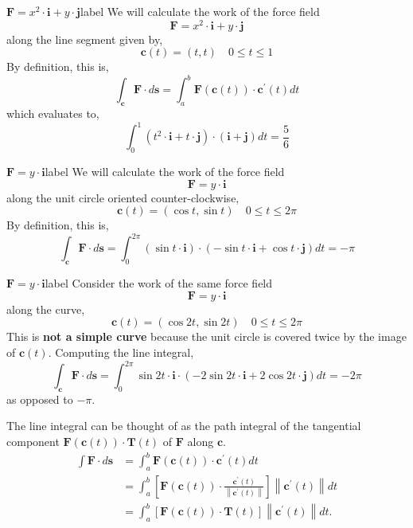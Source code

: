 \begin{ex}{$\mathbf{F} = x^2 \cdot \mathbf{i} + y \cdot \mathbf{j}$}{label}
	We will calculate the work of the force field
	\[\mathbf{F} = x^2 \cdot \mathbf{i} + y \cdot \mathbf{j}\]
	along the line segment given by,
	\[\mathbf{c}(t) = (t, t) \quad 0 \leq t \leq 1\]
	By definition, this is, 
	\[\int_{\mathbf{c}} \mathbf{F} \cdot d \mathbf{s}=\int_a^b \mathbf{F}(\mathbf{c}(t)) \cdot \mathbf{c}^{\prime}(t) d t\]
	which evaluates to,
	\[\int_0^1\left(t^2 \cdot \mathbf{i}+t \cdot \mathbf{j}\right) \cdot(\mathbf{i}+\mathbf{j}) d t = \frac{5}{6}\]
\end{ex}

\begin{ex}{$\mathbf{F} = y \cdot \mathbf{i}$}{label}
	We will calculate the work of the force field
	\[\mathbf{F} = y \cdot \mathbf{i}\]
	along the unit circle oriented counter-clockwise,
	\[\mathbf{c}(t) = (\cos t, \sin t) \quad 0 \leq t \leq 2 \pi\]
	By definition, this is, 
	\[\int_{\mathbf{c}} \mathbf{F} \cdot d \mathbf{s} = \int_{0}^{2\pi} (\sin t \cdot \mathbf{i}) \cdot (-\sin t \cdot \mathbf{i} + \cos t \cdot \mathbf{j}) dt = -\pi\]
\end{ex}

\begin{ex}{$\mathbf{F} = y \cdot \mathbf{i}$}{label}
	Consider the work of the same force field
	\[\mathbf{F} = y \cdot \mathbf{i}\]
	along the curve,
	\[\mathbf{c}(t) = (\cos 2t, \sin 2t) \quad 0 \leq t \leq 2\pi\]
	This is \textbf{not a simple curve} because the unit circle is covered twice by the image of $\mathbf{c}(t)$. Computing the line integral,
	\[\int_{\mathbf{c}} \mathbf{F} \cdot d \mathbf{s} = \int_0^{2\pi} \sin 2t \cdot \mathbf{i} \cdot (-2 \sin 2t \cdot \mathbf{i} + 2 \cos 2t \cdot \mathbf{j}) dt = -2\pi\]
	as opposed to $-\pi$.
\end{ex}

\begin{rmk}
	The line integral can be thought of as the path integral of the tangential component $\mathbf{F}(\mathbf{c}(t)) \cdot \mathbf{T}(t)$ of $\mathbf{F}$ along $\mathbf{c}$.
	\begin{align*}
		\int \mathbf{F} \cdot d \mathbf{s} & =\int_a^b \mathbf{F}(\mathbf{c}(t)) \cdot \mathbf{c}^{\prime}(t) d t \\
		& =\int_a^b\left[\mathbf{F}(\mathbf{c}(t)) \cdot \frac{\mathbf{c}^{\prime}(t)}{\left\|\mathbf{c}^{\prime}(t)\right\|}\right]\left\|\mathbf{c}^{\prime}(t)\right\| d t \\
		& =\int_a^b[\mathbf{F}(\mathbf{c}(t)) \cdot \mathbf{T}(t)]\left\|\mathbf{c}^{\prime}(t)\right\| d t .
	\end{align*}
\end{rmk}


